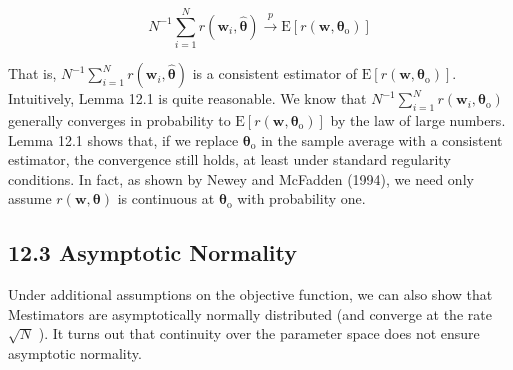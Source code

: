 \documentclass[10pt]{article}
\begin{document}
\begin{equation*}
N^{-1} \sum_{i=1}^{N} r\left(\mathbf{w}_{i}, \hat{\boldsymbol{\theta}}\right) \xrightarrow{p} \mathrm{E}\left[r\left(\mathbf{w}, \boldsymbol{\theta}_{\mathrm{o}}\right)\right] \tag{12.13}
\end{equation*}


That is, $N^{-1} \sum_{i=1}^{N} r\left(\mathbf{w}_{i}, \hat{\boldsymbol{\theta}}\right)$ is a consistent estimator of $\mathrm{E}\left[r\left(\mathbf{w}, \boldsymbol{\theta}_{\mathrm{o}}\right)\right]$.\\
Intuitively, Lemma 12.1 is quite reasonable. We know that $N^{-1} \sum_{i=1}^{N} r\left(\mathbf{w}_{i}, \boldsymbol{\theta}_{\mathrm{o}}\right)$ generally converges in probability to $\mathrm{E}\left[r\left(\mathbf{w}, \boldsymbol{\theta}_{\mathrm{o}}\right)\right]$ by the law of large numbers. Lemma 12.1 shows that, if we replace $\boldsymbol{\theta}_{\mathrm{o}}$ in the sample average with a consistent estimator, the convergence still holds, at least under standard regularity conditions. In fact, as shown by Newey and McFadden (1994), we need only assume $r(\mathbf{w}, \boldsymbol{\theta})$ is continuous at $\boldsymbol{\theta}_{\mathrm{o}}$ with probability one.

\subsection*{12.3 Asymptotic Normality}
Under additional assumptions on the objective function, we can also show that Mestimators are asymptotically normally distributed (and converge at the rate $\sqrt{N}$ ). It turns out that continuity over the parameter space does not ensure asymptotic normality.
\end{document}
